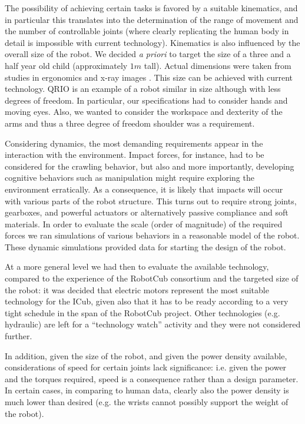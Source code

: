 The possibility of achieving certain tasks is favored by a suitable kinematics, 
and in particular this translates into the determination of the range of movement 
and the number of controllable joints (where clearly replicating the human body 
in detail is impossible with current technology). Kinematics is also 
influenced by the overall size of the robot. We decided {\em a priori} to target the 
size of a three and a half year old child (approximately $1m$ tall). Actual 
dimensions were taken from studies in ergonomics and x-ray images \cite{tilley01measure}. 
This size can be achieved with current technology. QRIO \cite{sony-qrio} is an example 
of a robot similar in size although with less degrees of freedom. In particular, 
our specifications had to consider hands and moving eyes. Also, we wanted to 
consider the workspace and dexterity of the arms and thus a three degree of 
freedom shoulder was a requirement. 


Considering dynamics, the most demanding requirements appear in the 
interaction with the environment. Impact forces, for instance, had to be 
considered for the crawling behavior, but also and more importantly, developing 
cognitive behaviors such as manipulation might require exploring the environment 
erratically. As a consequence, it is likely that impacts will occur with
various parts of the robot structure. This turns out to require strong 
joints, gearboxes, and powerful actuators or alternatively
passive compliance and soft materials. In order to evaluate 
the scale (order of magnitude) of the required forces we ran simulations 
of various behaviors in a reasonable model of the robot. These dynamic simulations 
provided data for starting the design of the robot.

At a more general level we had then to evaluate the available technology, compared 
to the experience of the RobotCub consortium and the targeted size of the robot: 
it was decided that electric motors represent the most suitable technology for 
the ICub, given also that it has to be ready according to a very 
tight schedule in the span of the RobotCub project. Other technologies 
(e.g. hydraulic) are left for a ``technology watch'' activity and they were 
not considered further.

In addition, given the size of the robot, and given the power density available, 
considerations of speed for certain joints lack significance: i.e. given the 
power and the torques required, speed is a consequence rather than a design 
parameter. In certain cases, in comparing to human data, clearly also the power 
density is much lower than desired (e.g. the wrists cannot possibly support the weight 
of the robot).

